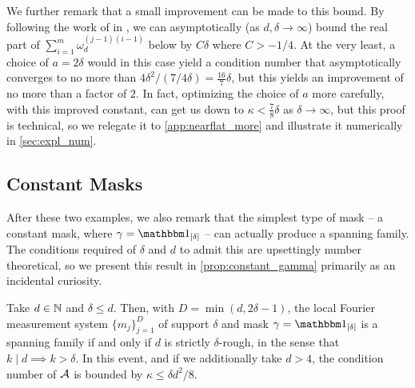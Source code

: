 We further remark that a small improvement can be made to this bound.  By following the work of \citeauthor{mercerXXXXdirichlet} in \cite{mercerXXXXdirichlet}, we can asymptotically (as $d, \delta \to \infty$) bound the real part of $\sum_{i = 1}^m \omega_d^{(j - 1)(i - 1)}$ below by $C \delta$ where $C > - 1 / 4$.  At the very least, a choice of $a = 2 \delta$ would in this case yield a condition number that asymptotically converges to no more than $4 \delta^2 / (7 / 4 \delta) = \frac{16}{7} \delta$, but this yields an improvement of no more than a factor of $2$.  In fact, optimizing the choice of $a$ more carefully, with this improved constant, can get us down to $\kappa < \frac{7}{8} \delta$ as $\delta \to \infty$, but this proof is technical, so we relegate it to \cref{app:nearflat_more} and illustrate it numerically in \cref{sec:expl_num}.


\subsection{Constant Masks}
\label{sec:const_mask}
After these two examples, we also remark that the simplest type of mask -- a constant mask, where $\gamma = \one_{[\delta]}$ -- can actually produce a spanning family.  The conditions required of $\delta$ and $d$ to admit this are upsettingly number theoretical, so we present this result in \cref{prop:constant_gamma} primarily as an incidental curiosity.

\begin{proposition}
  Take $d \in \mathbb{N}$ and $\delta \le d$.  Then, with $D = \min(d, 2 \delta - 1)$, the local Fourier measurement system $\{m_j\}_{j = 1}^D$ of support $\delta$ and mask $\gamma = \one_{[\delta]}$ is a spanning family if and only if $d$ is strictly $\delta$-rough, in the sense that $k \mid d \implies k > \delta$.  In this event, and if we additionally take $d > 4$, the condition number of $\mathcal{A}$ is bounded by $\kappa \le \delta d^2 / 8$.
  \label{prop:constant_gamma}
\end{proposition}

